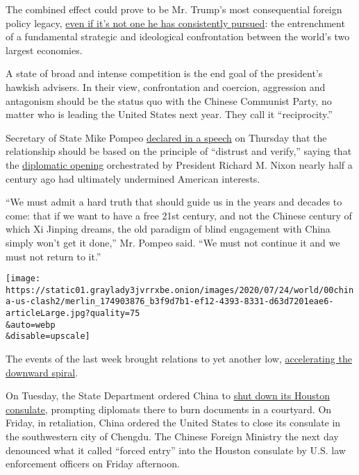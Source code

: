 The combined effect could prove to be Mr. Trump's most consequential
foreign policy legacy,
\href{https://www.nytimes3xbfgragh.onion/2020/06/18/us/politics/trump-china-bolton.html}{even
if it's not one he has consistently pursued}: the entrenchment of a
fundamental strategic and ideological confrontation between the world's
two largest economies.

A state of broad and intense competition is the end goal of the
president's hawkish advisers. In their view, confrontation and coercion,
aggression and antagonism should be the status quo with the Chinese
Communist Party, no matter who is leading the United States next year.
They call it ``reciprocity.''

Secretary of State Mike Pompeo
\href{https://www.state.gov/communist-china-and-the-free-worlds-future/}{declared
in a speech} on Thursday that the relationship should be based on the
principle of ``distrust and verify,'' saying that the
\href{https://www.nytimes3xbfgragh.onion/1972/02/24/archives/nixon-talks-further-with-chou-and-drives-to-view-great-wall-wider.html}{diplomatic
opening} orchestrated by President Richard M. Nixon nearly half a
century ago had ultimately undermined American interests.

``We must admit a hard truth that should guide us in the years and
decades to come: that if we want to have a free 21st century, and not
the Chinese century of which Xi Jinping dreams, the old paradigm of
blind engagement with China simply won't get it done,'' Mr. Pompeo said.
``We must not continue it and we must not return to it.''

\texttt{[image: https://static01.graylady3jvrrxbe.onion/images/2020/07/24/world/00china-us-clash2/merlin\_174903876\_b3f9d7b1-ef12-4393-8331-d63d7201eae6-articleLarge.jpg?quality=75\\\&auto=webp\\\&disable=upscale]}

The events of the last week brought relations to yet another low,
\href{https://www.nytimes3xbfgragh.onion/2020/07/14/world/asia/cold-war-china-us.html}{accelerating
the downward spiral}.

On Tuesday, the State Department ordered China to
\href{https://www.nytimes3xbfgragh.onion/2020/07/22/world/asia/us-china-houston-consulate.html}{shut
down its Houston consulate}, prompting diplomats there to burn documents
in a courtyard. On Friday, in retaliation, China ordered the United
States to close its consulate in the southwestern city of Chengdu. The
Chinese Foreign Ministry the next day denounced what it called ``forced
entry'' into the Houston consulate by U.S. law enforcement officers on
Friday afternoon.

